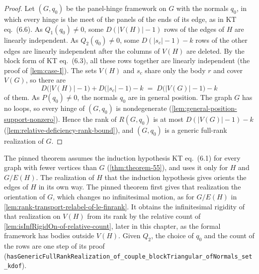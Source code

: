 \begin{proof}
  Let $(G, q_0)$ be the panel-hinge framework on $G$ with the normals
  $q_0$, in which every hinge is the meet of the panels of the ends of
  its edge, as in KT eq.~(6.6). As $Q_1(q_0) \neq 0$, some
  $D(|V(H)| - 1)$ rows of the edges of $H$ are linearly independent. As
  $Q_2(q_0) \neq 0$, some $D(|s_c| - 1) - k$ rows of the other edges are
  linearly independent after the columns of $V(H)$ are deleted. By the
  block form of KT eq.~(6.3), all these rows together are linearly
  independent (the proof of \cref{lem:case-I}). The sets $V(H)$ and $s_c$
  share only the body $r$ and cover $V(G)$, so there are
  \[
    D\bigl(|V(H)| - 1\bigr) + D\bigl(|s_c| - 1\bigr) - k
    \;=\; D\bigl(|V(G)| - 1\bigr) - k
  \]
  of them. As $P(q_0) \neq 0$, the normals $q_0$ are in general position.
  The graph $G$ has no loops, so every hinge of $(G, q_0)$ is
  nondegenerate (\cref{lem:general-position-support-nonzero}). Hence the
  rank of $R(G, q_0)$ is at most $D(|V(G)| - 1) - k$
  (\cref{lem:relative-deficiency-rank-bound}), and $(G, q_0)$ is a
  generic full-rank realization of $G$.
\end{proof}

\begin{fmlnote}
  The pinned theorem assumes the induction hypothesis KT eq.~(6.1) for
  every graph with fewer vertices than $G$ (\cref{thm:theorem-55}), and
  uses it only for $H$ and $G/E(H)$. The realization of $H$ that the
  induction hypothesis gives orients the edges of $H$ in its own way. The
  pinned theorem first gives that realization the orientation of $G$,
  which changes no infinitesimal motion, as for $G/E(H)$ in
  \cref{lem:rank-transport-relabel-of-le-finrank}. It obtains the
  infinitesimal rigidity of that realization on $V(H)$ from its rank by
  the relative count of \cref{lem:isInfRigidOn-of-relative-count}, later
  in this chapter, as the formal framework has bodies outside $V(H)$.
  Given $Q_2$, the choice of $q_0$ and the count of the rows are one
  step of its proof
  (\texttt{hasGenericFullRankRealization\_\allowbreak{}of\_\allowbreak{}couple\_\allowbreak{}blockTriangular\_\allowbreak{}ofNormals\_\allowbreak{}set\_\allowbreak{}kdof}).
\end{fmlnote}

